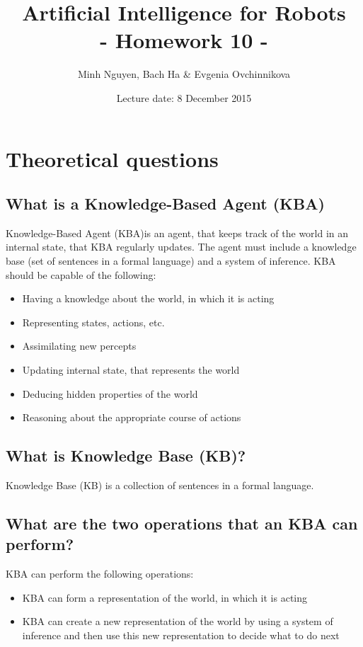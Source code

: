 \documentclass[a4paper, 12pt]{article}
\title{Artificial Intelligence for Robots \\
				- Homework 10 -}
\author{Minh Nguyen, Bach Ha \& Evgenia Ovchinnikova}
\date{Lecture date: 8 December 2015}
\begin{document}
\maketitle

\section{Theoretical questions}
   
\subsection{What is a Knowledge-Based Agent (KBA)}

Knowledge-Based Agent (KBA)is an agent, that keeps track of the world in an internal state, that KBA regularly updates. The agent must include a knowledge base (set of sentences in a formal language) and a system of inference. KBA should be capable of the following:

\begin{itemize}
\item Having a knowledge about the world, in which it is acting
\item Representing states, actions, etc.
\item Assimilating new percepts
\item Updating internal state, that represents the world
\item Deducing hidden properties of the world
\item Reasoning about the appropriate course of actions
\end{itemize}


\subsection{What is Knowledge Base (KB)?}

Knowledge Base (KB) is a collection of sentences in a formal language.

\subsection{What are the two operations that an KBA can perform?}

KBA can perform the following operations:

\begin{itemize}
\item KBA can form a representation of the world, in which it is acting
\item KBA can create a new representation of the world by using a system of inference and then use this new representation to decide what to do next
\end{itemize}
\end{document}

